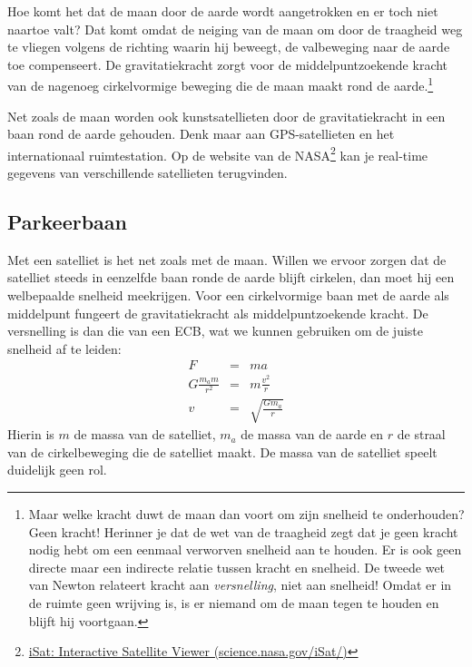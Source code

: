\documentclass{ximera}
\begin{document}
	\author{Bart Lambregs}
    \xmsource



	Hoe komt het dat de maan door de aarde wordt aangetrokken en er toch niet naartoe valt? Dat komt omdat de neiging van de maan om door de traagheid weg te vliegen volgens de richting waarin hij beweegt, de valbeweging naar de aarde toe compenseert. De gravitatiekracht zorgt voor de middelpuntzoekende kracht van de nagenoeg cirkelvormige beweging die de maan maakt rond de aarde.\footnote{Maar welke kracht duwt de maan dan voort om zijn snelheid te onderhouden? Geen kracht! Herinner je dat de wet van de traagheid zegt dat je geen kracht nodig hebt om een eenmaal verworven snelheid aan te houden. Er is ook geen directe maar een indirecte relatie tussen kracht en snelheid. De tweede wet van Newton relateert kracht aan \textit{versnelling}, niet aan snelheid! Omdat er in de ruimte geen wrijving is, is er niemand om de maan tegen te houden en blijft hij voortgaan.}
	
	Net zoals de maan worden ook kunstsatellieten door de gravitatiekracht in een baan rond de aarde gehouden. Denk maar aan GPS-satellieten en het internationaal ruimtestation. Op de website van de NASA\footnote{\href{http://science.nasa.gov/iSat/}{iSat: Interactive Satellite Viewer (science.nasa.gov/iSat/)}} kan je real-time gegevens van verschillende satellieten terugvinden.
	
	\subsection{Parkeerbaan}
	
	Met een satelliet is het net zoals met de maan. Willen we ervoor zorgen dat de satelliet steeds in eenzelfde baan ronde de aarde blijft cirkelen, dan moet hij een welbepaalde snelheid meekrijgen. Voor een cirkelvormige baan met de aarde als middelpunt fungeert de gravitatiekracht als middelpuntzoekende kracht. De versnelling is dan die van een ECB, wat we kunnen gebruiken om de juiste snelheid af te leiden:
	\begin{eqnarray*}
	F&=&ma\\
	G\frac{m_am}{r^2}&=&m\frac{v^2}{r}\\
	v&=&\sqrt{\frac{Gm_a}{r}}
	\end{eqnarray*}
	Hierin is $m$ de massa van de satelliet, $m_a$ de massa van de aarde en $r$ de straal van de cirkelbeweging die de satelliet maakt. De massa van de satelliet speelt duidelijk geen rol. 
	
\end{document}
